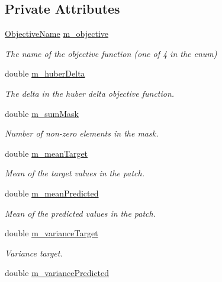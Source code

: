 \subsection*{Private Attributes}
\begin{DoxyCompactItemize}
\item 
\hyperlink{classObjective_ac2cb31fca71c5a4b99b35c879742644c}{Objective\+Name} \hyperlink{classObjective_a51987f37a05068aba28866a967eb4e67}{m\+\_\+objective}
\begin{DoxyCompactList}\small\item\em The name of the objective function (one of 4 in the enum) \end{DoxyCompactList}\item 
double \hyperlink{classObjective_a324b9129dd2d2c4bdc868587883e35b9}{m\+\_\+huber\+Delta}
\begin{DoxyCompactList}\small\item\em The delta in the huber delta objective function. \end{DoxyCompactList}\item 
double \hyperlink{classObjective_a64f93d50b1443c29b50dfb7b451b62d1}{m\+\_\+sum\+Mask}
\begin{DoxyCompactList}\small\item\em Number of non-\/zero elements in the mask. \end{DoxyCompactList}\item 
double \hyperlink{classObjective_a4d7819d119c36c2aa8aac0baf79c961a}{m\+\_\+mean\+Target}
\begin{DoxyCompactList}\small\item\em Mean of the target values in the patch. \end{DoxyCompactList}\item 
double \hyperlink{classObjective_a2b7cdd589578394f2c5a847a0a9aff61}{m\+\_\+mean\+Predicted}
\begin{DoxyCompactList}\small\item\em Mean of the predicted values in the patch. \end{DoxyCompactList}\item 
double \hyperlink{classObjective_a7344fafbba4c5c3aa51b3fea7f209e32}{m\+\_\+variance\+Target}
\begin{DoxyCompactList}\small\item\em Variance target. \end{DoxyCompactList}\item 
double \hyperlink{classObjective_a82366bcac1547f5709b6452d168d3e16}{m\+\_\+variance\+Predicted}

\end{DoxyCompactItemize}
